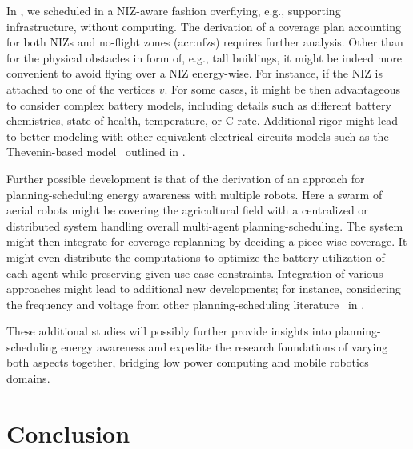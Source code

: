 
In , we scheduled in a NIZ-aware fashion overflying, e.g., supporting infrastructure, without computing. The derivation of a coverage plan accounting for both NIZs and no-flight zones (\Gls{acr:nfz}s) requires further analysis. Other than for the physical obstacles in form of, e.g., tall buildings, it might be indeed more convenient to avoid flying over a NIZ energy-wise. For instance, if the NIZ is attached to one of the vertices $v$. For some cases, it might be then advantageous to consider complex battery models, including details such as different battery chemistries, state of health, temperature, or C-rate. Additional rigor might lead to better modeling with other equivalent electrical circuits models such as the Thevenin-based model~\citep{chen2006accurate,hasan2018exogenous,hinz2019comparison,mousavi2014various,zhang2018online,salameh1992mathematical} outlined in .


Further possible development is that of the derivation of an approach for planning-scheduling energy awareness with multiple robots. Here a swarm of aerial robots might be covering the agricultural field with a centralized or distributed system handling overall multi-agent planning-scheduling. The system might then integrate  for coverage replanning by deciding a piece-wise coverage. It might even distribute the computations to optimize the battery utilization of each agent while preserving given use case constraints.
Integration of various approaches might lead to additional new developments; for instance, considering the frequency and voltage from other planning-scheduling literature~\citep{zhang2007low,brateman2006energy} in .

These additional studies will possibly further provide insights into planning-scheduling energy awareness and expedite the research foundations of varying both aspects together, bridging low power computing and mobile robotics domains.


\section{Conclusion}
\label{sec:conc-conc}


